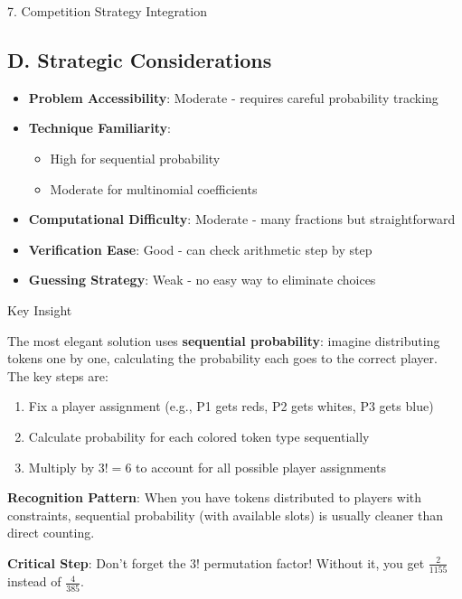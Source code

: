 \documentclass[12pt]{article}
\begin{document}
\begin{competitionbox}{7. Competition Strategy Integration}
\subsection*{D. Strategic Considerations}
\begin{itemize}[leftmargin=*]
    \item \textbf{Problem Accessibility}: Moderate - requires careful probability tracking
    \item \textbf{Technique Familiarity}: 
    \begin{itemize}
        \item High for sequential probability
        \item Moderate for multinomial coefficients
    \end{itemize}
    \item \textbf{Computational Difficulty}: Moderate - many fractions but straightforward
    \item \textbf{Verification Ease}: Good - can check arithmetic step by step
    \item \textbf{Guessing Strategy}: Weak - no easy way to eliminate choices
\end{itemize}

\end{competitionbox}

\begin{highlightbox}{Key Insight}

The most elegant solution uses \textbf{sequential probability}: imagine distributing tokens one by one, calculating the probability each goes to the correct player. The key steps are:
\begin{enumerate}
    \item Fix a player assignment (e.g., P1 gets reds, P2 gets whites, P3 gets blue)
    \item Calculate probability for each colored token type sequentially
    \item Multiply by $3! = 6$ to account for all possible player assignments
\end{enumerate}

\vspace{0.5em}
\noindent\textbf{Recognition Pattern}: When you have tokens distributed to players with constraints, sequential probability (with available slots) is usually cleaner than direct counting.

\vspace{0.5em}
\noindent\textbf{Critical Step}: Don't forget the $3!$ permutation factor! Without it, you get $\frac{2}{1155}$ instead of $\frac{4}{385}$.

\end{highlightbox}
\end{document}
